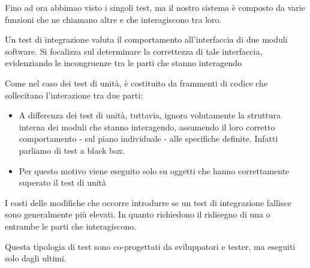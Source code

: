 Fino ad ora abbimao visto i singoli test, ma il nostro sistema è
composto da varie funzioni che ne chiamano altre e che interagiscono tra loro.

Un test di integrazione valuta il comportamento all'interfaccia di due moduli
software. Si focalizza sul determinare la correttezza di tale interfaccia,
evidenziando le incongruenze tra le parti che stanno interagendo



Come nel caso dei test di unità, è costituito da frammenti di codice che
sollecitano l'interazione tra due parti:

\begin{itemize}
  \item A differenza dei test di unità, tuttavia, ignora volutamente la
        struttura interna dei moduli che stanno interagendo, assumendo il loro
        corretto comportamento - sul piano individuale - alle specifiche definite.
        Infatti parliamo di test a black box.
  \item Per questo motivo viene eseguito solo su oggetti che hanno
        correttamente superato il test di unità
\end{itemize}





I costi delle modifiche che occorre introdurre se un test di integrazione
fallisce sono generalmente più elevati. In quanto richiedono il ridisegno di
una o entrambe le parti che interagiscono.

Questa tipologia di test sono co-progettati da sviluppatori e tester, ma eseguiti
solo dagli ultimi.

